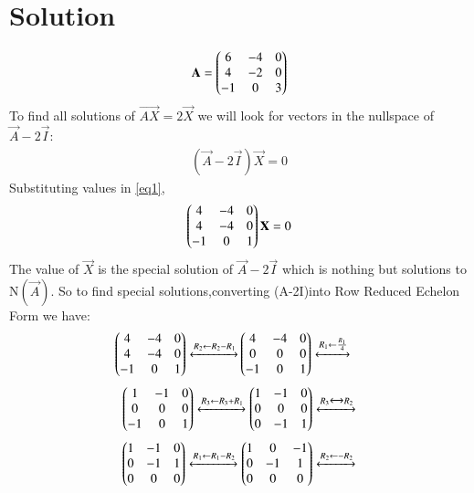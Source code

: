 \documentclass[journal,12pt,twocolumn]{IEEEtran}
\begin{document}
\section{Solution}
\begin{flushleft}
\begin{align}
\mathbf{A}=
\begin{pmatrix}6 & -4 & 0\\
4& -2 & 0\\
-1 &0 &3\end{pmatrix}
\end{align}
To find all solutions of $\vec{AX}=2\vec{X}$ we will look for vectors in the nullspace of$\vec{A}-2\vec{I}$:\\
\begin{align}\label{eq1}
(\vec{A}-2\vec{I})\vec X=0
\end{align}
Substituting values in \eqref{eq1},
\begin{align}
\begin{pmatrix}4 & -4 & 0\\
4 & -4 & 0\\
-1 &0 &1\end{pmatrix}
\mathbf{X}=0
\end{align}
The value of $\vec{X}$ is the special solution of $\vec A-2\vec I$ which is nothing but solutions to N$(\vec{A})$.
So to find special solutions,converting (\vec A-2\vec I)into
Row Reduced Echelon Form we have:
\begin{align}
\begin{pmatrix}4& -4&0\\
4 & -4 & 0\\
-1 & 0 &1
\end{pmatrix}
\xleftrightarrow[]{R_2 \leftarrow R_2- R_1 } 
&
\begin{pmatrix}4&-4&0\\
0&0&0\\
-1&0&1\end{pmatrix}
\xleftrightarrow[]{R_1 \leftarrow \frac{R_1}{4} } \nonumber 
\end{align}
\begin{align}
    \begin{pmatrix}1&-1&0\\
            0&0&0\\
            -1&0&1\end{pmatrix}
    \xleftrightarrow[]{R_3 \leftarrow R_3+R_1 }
    \begin{pmatrix}1&-1&0\\
            0&0&0\\
            0&-1&1\end{pmatrix}
    \xleftrightarrow[]{R_3 \xleftrightarrow[]{} R_2 } \nonumber
\end{align}
\begin{align}
    \myvec{1&-1&0\\
    0&-1&1\\
    0&0&0}
    \xleftrightarrow[]{R_1 \leftarrow R_1-R_2} 
    \myvec{1&0&-1\\
    0&-1&1\\
    0&0&0}   
    \xleftrightarrow[]{R_2 \leftarrow -R_2} \nonumber

\end{align}
\end{flushleft}
\end{document}
